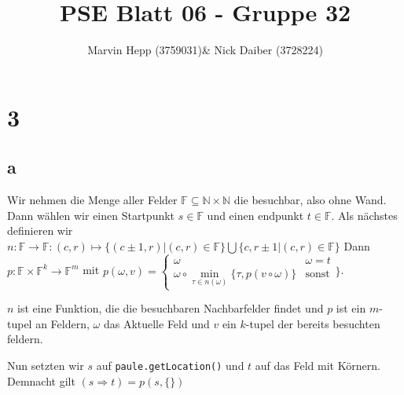 \documentclass{article}
\title{PSE Blatt 06 - Gruppe 32}
\author{Marvin Hepp (3759031)\& Nick Daiber (3728224)}
\newcommand{\N}{\mathbb{N}}
\newcommand{\F}{\mathbb{F}}
\begin{document}
\maketitle
\section*{3}
\subsection*{a}
Wir nehmen die Menge aller Felder
$\F \subseteq \N\times\N$
die besuchbar, also ohne Wand.
Dann wählen wir einen Startpunkt $s\in \F$ und einen endpunkt
$t\in \F$.
Als nächstes definieren wir 
$n:\F\rightarrow\F:(c, r)\mapsto\{(c\pm 1, r)|(c,r)\in\F\}\bigcup \{c, r\pm 1|(c,r)\in\F\}$
Dann $p:\F\times\F^k\rightarrow \F^m$ mit 
$p(\omega, v) =\begin{cases}\omega&\omega=t\\
    \omega\circ \min\limits_{\tau\in n(\omega)}\{\tau, p(v\circ\omega)\}&\text{sonst}
\end{cases}\}$.

$n$ ist eine Funktion, die die besuchbaren Nachbarfelder findet
und $p$ ist ein $m$-tupel an Feldern, $\omega$ das Aktuelle Feld und
$v$ ein $k$-tupel der bereits besuchten feldern.

Nun setzten wir $s$ auf \verb|paule.getLocation()| und $t$ auf das Feld mit
Körnern. Demnacht gilt $(s\Rightarrow t)=p(s, \{\})$
\end{document}

